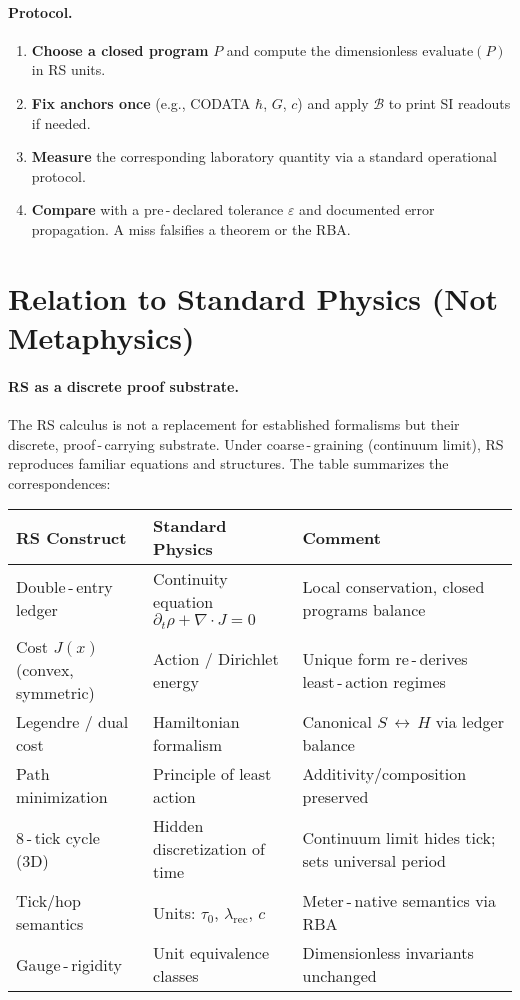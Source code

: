 \documentclass[11pt]{article}
\newcommand{\lamrec}{\lambda_{\mathrm{rec}}}
\newcommand{\tauzero}{\tau_{0}}
\theoremstyle{remark}
\begin{document}
\paragraph{Protocol.}
\begin{enumerate}
  \item \textbf{Choose a closed program} $P$ and compute the dimensionless \(\text{evaluate}(P)\) in RS units.
  \item \textbf{Fix anchors once} (e.g., CODATA $\hbar$, $G$, $c$) and apply $\mathcal B$ to print SI readouts if needed.
  \item \textbf{Measure} the corresponding laboratory quantity via a standard operational protocol.
  \item \textbf{Compare} with a pre\,\mbox{-}\,declared tolerance $\varepsilon$ and documented error propagation. A miss falsifies a theorem or the RBA.
\end{enumerate}

\section{Relation to Standard Physics (Not Metaphysics)}
\paragraph{RS as a discrete proof substrate.}
The RS calculus is not a replacement for established formalisms but their discrete, proof\,\mbox{-}\,carrying substrate. Under coarse\,\mbox{-}\,graining (continuum limit), RS reproduces familiar equations and structures. The table summarizes the correspondences:

\begin{center}
\renewcommand{\arraystretch}{1.2}
\begin{tabular}{|l|l|l|}
\hline
\textbf{RS Construct} & \textbf{Standard Physics} & \textbf{Comment} \\
\hline
Double\,\mbox{-}\,entry ledger & Continuity equation $\partial_{t}\rho+\nabla\!\cdot J=0$ & Local conservation, closed programs balance \\
\hline
Cost $J(x)$ (convex, symmetric) & Action / Dirichlet energy & Unique form re\,\mbox{-}\,derives least\,\mbox{-}\,action regimes \\
\hline
Legendre / dual cost & Hamiltonian formalism & Canonical $S\,\leftrightarrow\,H$ via ledger balance \\
\hline
Path minimization & Principle of least action & Additivity/composition preserved \\
\hline
8\,\mbox{-}\,tick cycle (3D) & Hidden discretization of time & Continuum limit hides tick; sets universal period \\
\hline
Tick/hop semantics & Units: $\tauzero$, $\lamrec$, $c$ & Meter\,\mbox{-}\,native semantics via RBA \\
\hline
Gauge\,\mbox{-}\,rigidity & Unit equivalence classes & Dimensionless invariants unchanged \\
\hline
\end{tabular}
\end{center}
\end{document}
